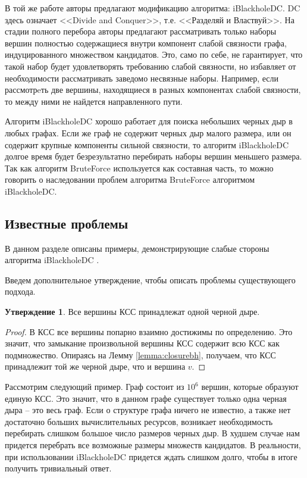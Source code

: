 \documentclass[12pt,a4paper,oneside,openany]{article}
\theoremstyle{definition}
\theoremstyle{lemma}
\newtheorem{lemma}{Утверждение}[]
\theoremstyle{remark}
\begin{document}
В той же работе авторы предлагают модификацию алгоритма: iBlackholeDC. DC здесь означает <<Divide and Conquer>>, т.е. <<Разделяй и Властвуй>>.
На стадии полного перебора авторы предлагают рассматривать только наборы вершин полностью содержащиеся внутри компонент слабой связности
графа, индуцированного множеством кандидатов.
Это, само по себе, не гарантирует, что такой набор будет удовлетворять требованию слабой связности, но избавляет от необходимости
рассматривать заведомо несвязные наборы. Например, если рассмотрeть две вершины, находящиеся в разных компонентах слабой связности,
то между ними не найдется направленного пути.

Алгоритм iBlackholeDC хорошо работает для поиска небольших черных дыр в любых графах.
Если же граф не содержит черных дыр малого размера, или он содержит крупные компоненты сильной связности,
то алгоритм iBlackholeDC долгое время будет безрезультатно перебирать наборы вершин меньшего размера.
Так как алгоритм BruteForce используется как составная часть, то можно говорить о наследовании проблем
алгоритма BruteForce алгоритмом iBlackholeDC.

\subsection{Известные проблемы}\label{subsec:knownissues}

В данном разделе описаны примеры, демонстрирующие слабые стороны алгоритма iBlackholeDC \cite{li2010detecting}.

Введем дополнительное утверждение, чтобы описать проблемы существующего подхода.

\begin{lemma}{}
Все вершины КСС принадлежат одной черной дыре.
\end{lemma}
\begin{proof}
В КСС все вершины попарно взаимно достижимы по определению.
Это значит, что замыкание произвольной вершины КСС содержит всю КСС как подмножество.
Опираясь на Лемму \ref{lemma:closurebh}, получаем, что КСС принадлежит той же черной дыре, что и вершина $v$.
\end{proof}

Рассмотрим следующий пример.
Граф состоит из $10^6$ вершин, которые образуют единую КСС.
Это значит, что в данном графе существует только одна черная дыра -- это весь граф.
Если о структуре графа ничего не известно, а также нет достаточно больших вычислительных ресурсов,
возникает необходимость перебирать слишком большое число размеров черных дыр.
В худшем случае нам придется перебрать все возможные размеры множеств кандидатов.
В реальности, при использовании iBlackholeDC придется ждать слишком долго, чтобы в итоге получить тривиальный ответ.
\end{document}
